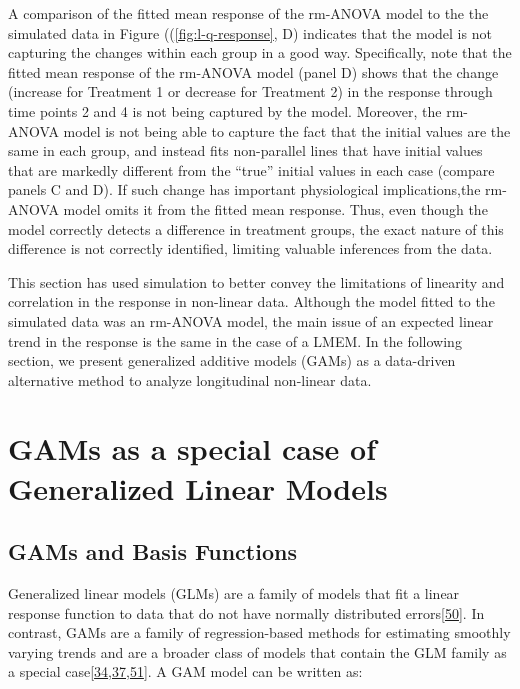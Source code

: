 \documentclass[
]{article}
\begin{document}
A comparison of the fitted mean response of the rm-ANOVA model to the the simulated data in Figure ((\ref{fig:l-q-response}, D) indicates that the model is not capturing the changes within each group in a good way. Specifically, note that the fitted mean response of the rm-ANOVA model (panel D) shows that the change (increase for Treatment 1 or decrease for Treatment 2) in the response through time points 2 and 4 is not being captured by the model. Moreover, the rm-ANOVA model is not being able to capture the fact that the initial values are the same in each group, and instead fits non-parallel lines that have initial values that are markedly different from the ``true'' initial values in each case (compare panels C and D). If such change has important physiological implications,the rm-ANOVA model omits it from the fitted mean response. Thus, even though the model correctly detects a difference in treatment groups, the exact nature of this difference is not correctly identified, limiting valuable inferences from the data.

This section has used simulation to better convey the limitations of linearity and correlation in the response in non-linear data. Although the model fitted to the simulated data was an rm-ANOVA model, the main issue of an expected linear trend in the response is the same in the case of a LMEM. In the following section, we present generalized additive models (GAMs) as a data-driven alternative method to analyze longitudinal non-linear data.

\FloatBarrier

\hypertarget{gams-as-a-special-case-of-generalized-linear-models}{%
\section{GAMs as a special case of Generalized Linear Models}\label{gams-as-a-special-case-of-generalized-linear-models}}

\hypertarget{gams-and-basis-functions}{%
\subsection{GAMs and Basis Functions}\label{gams-and-basis-functions}}

Generalized linear models (GLMs) are a family of models that fit a linear response function to data that do not have normally distributed errors{[}\protect\hyperlink{ref-nelder1972}{50}{]}. In contrast, GAMs are a family of regression-based methods for estimating smoothly varying trends and are a broader class of models that contain the GLM family as a special case{[}\protect\hyperlink{ref-simpson2018}{34},\protect\hyperlink{ref-wood2017}{37},\protect\hyperlink{ref-hastie1987}{51}{]}. A GAM model can be written as:
\end{document}
